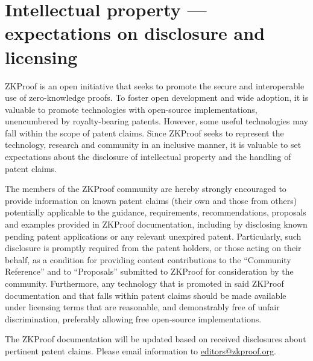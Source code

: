 \section*{\centering Intellectual property --- expectations on disclosure and licensing}
\label{prelim:IP}

\vspace{-1em}
	ZKProof is an open initiative that seeks to promote the secure and interoperable use of zero-knowledge proofs. 
	To foster open development and wide adoption, it is valuable to promote technologies with open-source implementations, unencumbered by royalty-bearing patents.
	However, some useful technologies may fall within the scope of patent claims. 
	Since ZKProof seeks to represent the technology, research and community in an inclusive manner, it is  
valuable to set expectations about the disclosure of intellectual property and the handling of patent claims.



	The members of the ZKProof community are hereby strongly encouraged to provide information on known patent claims 
	(their own and those from others)
	potentially applicable to the guidance, requirements, recommendations, proposals and examples provided in ZKProof documentation, including by disclosing known pending patent applications or any relevant unexpired patent.
	Particularly, such disclosure is promptly required from the patent holders, or those acting on their behalf, as a condition for providing content contributions to the ``Community Reference'' and to ``Proposals'' submitted to ZKProof for consideration by the community.
	Furthermore, any technology that is promoted in said ZKProof documentation and that falls within patent claims should be made available under licensing terms that are reasonable, and demonstrably free of unfair discrimination, preferably allowing free open-source implementations.


	The ZKProof documentation will be updated based on received disclosures about pertinent patent claims.
	Please email information to \href{mailto:editors@zkproof.org}{editors@zkproof.org}.